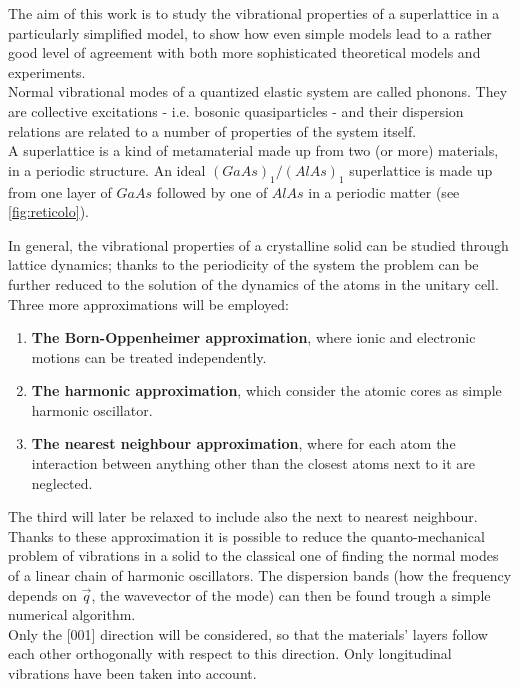 \documentclass{article}
\begin{document}
The aim of this work is to study the vibrational properties of a superlattice in a particularly simplified model, to show how even simple models lead to a rather good level of agreement with both more sophisticated theoretical models and experiments.\\
Normal vibrational modes of a quantized elastic system are called phonons. They are collective excitations - i.e. bosonic quasiparticles - and their dispersion relations are related to a number of properties of the system itself. \\
A superlattice is a kind of metamaterial made up from two (or more) materials, in a periodic structure. An ideal $(GaAs)_1/(AlAs)_1$ superlattice is made up from one layer of $GaAs$ followed by one of $AlAs$ in a periodic matter (see \autoref{fig:reticolo}).\smallskip

In general, the vibrational properties of a crystalline solid can be studied through lattice dynamics; thanks to the periodicity of the system the problem can be further reduced to the solution of the dynamics of the atoms in the unitary cell.\\
	Three more approximations will be employed:
	\begin{enumerate}
		\item \textbf{The Born-Oppenheimer approximation}, where ionic and electronic motions can be treated independently.
		\item \textbf{The harmonic approximation}, which consider the atomic cores as simple harmonic oscillator.
		\item \textbf{The nearest neighbour approximation}, where for each atom the interaction between anything other than the closest atoms next to it are neglected.
	\end{enumerate}
	The third will later be relaxed to include also the next to nearest neighbour.\\
	Thanks to these approximation it is possible to reduce the quanto-mechanical problem of vibrations in a solid to the classical one of finding the normal modes of a linear chain of harmonic oscillators. The dispersion bands (how the frequency depends on $\vec{q}$, the wavevector of the mode) can then be found trough a simple numerical algorithm.\\
Only the [001] direction will be considered, so that the materials' layers follow each other orthogonally with respect to this direction. Only longitudinal vibrations have been taken into account. \\
\end{document}
